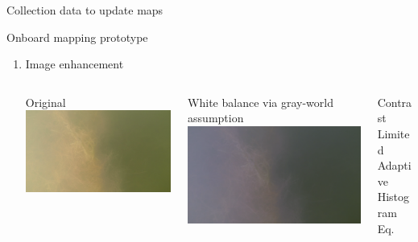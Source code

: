 \documentclass[9pt,xcolor=table]{beamer}
\begin{document}
\begin{frame}{Collection data to update maps}
    \begin{block}{Onboard mapping prototype}
        \begin{enumerate}
            \item Image enhancement \\
        \begin{columns}
            \begin{column}{0.33\textwidth}
            {\tiny Original}
            \includegraphics[width=\textwidth,trim={0cm 0cm 0cm 0cm},clip]{img/orig.png}
            \end{column}
            \begin{column}{0.33\textwidth}
            {\tiny White balance via gray-world assumption}
            \includegraphics[width=\textwidth,trim={0cm 0cm 0cm 0cm},clip]{img/whiteBalance.png}
            \end{column}
            \begin{column}{0.33\textwidth}
            {\tiny Contrast Limited Adaptive Histogram Eq.}

\end{column}
\end{columns}
\end{enumerate}
\end{block}
\end{frame}
\end{document}
